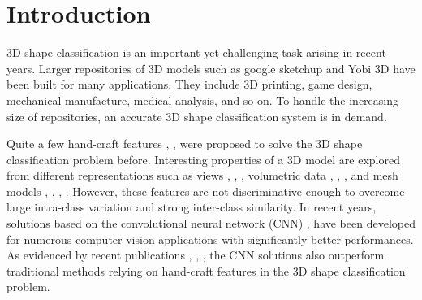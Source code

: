 \documentclass[preprint,12pt]{elsarticle}
\begin{document}




\section{Introduction} \label{sec.intro}

3D shape classification \cite{shilane2004princeton} is an important yet
challenging task arising in recent years. Larger repositories of 3D
models \cite{spaeth2016can} such as google sketchup and Yobi 3D have
been built for many applications. They include 3D printing, game design,
mechanical manufacture, medical analysis, and so on. To handle the
increasing size of repositories, an accurate 3D shape classification
system is in demand. 

Quite a few hand-craft features \cite{li2012shrec},
\cite{li2015comparison}, \cite{tangelder2008survey} were proposed to
solve the 3D shape classification problem before.  Interesting
properties of a 3D model are explored from different representations
such as views \cite{chaouch2007new}, \cite{chen2003visual},
\cite{ohbuchi2008salient}, volumetric data \cite{kazhdan2003rotation},
\cite{novotni2004shape}, \cite{sundar2003skeleton}, and mesh models
\cite{bronstein2011shape}, \cite{bronstein2010scale},
\cite{gal2007pose}, \cite{smeets2013meshsift}. However, these features
are not discriminative enough to overcome large intra-class variation
and strong inter-class similarity. In recent years, solutions based on
the convolutional neural network (CNN) \cite{krizhevsky2012imagenet},
\cite{lecun2015deep} have been developed for numerous computer vision
applications with significantly better performances.  As evidenced by
recent publications \cite{shapeNet}, \cite{savvashrec},
\cite{xie2015deepshape}, the CNN solutions also outperform traditional
methods relying on hand-craft features in the 3D shape classification
problem. 
\end{document}
